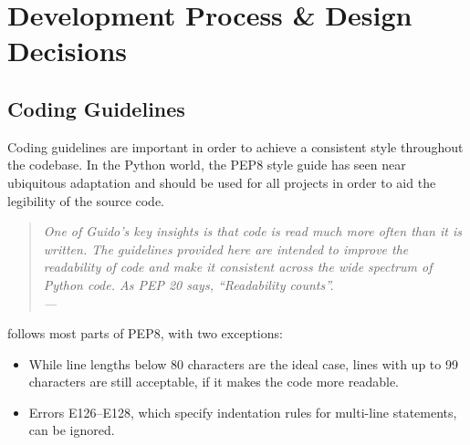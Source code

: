
\chapter{Development Process \& Design Decisions}

\label{ch:development}


\section{Coding Guidelines}


Coding guidelines are important in order to achieve a consistent style
throughout the codebase. In the Python world, the PEP8 style guide
\cite{pep8:2001} has seen near ubiquitous adaptation and should be used for all
projects in order to aid the legibility of the source code.

\begin{quote}{\slshape
One of Guido's key insights is that code is read much more often than it is
written. The guidelines provided here are intended to improve the readability of
code and make it consistent across the wide spectrum of Python code. As PEP 20
says, ``Readability counts''. \\ \medskip
---  \citep{pep8:2001}
}\end{quote}

\noindent \tangible{} follows most parts of PEP8, with two exceptions:

\begin{itemize}
	\item While line lengths below 80 characters are the ideal case, lines with up
		to 99 characters are still acceptable, if it makes the code more readable.
	\item Errors E126--E128, which specify indentation rules for multi-line
		statements, can be ignored.
\end{itemize}


